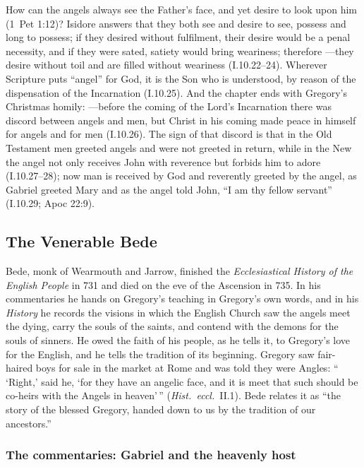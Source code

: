 How can the angels always see the Father's face, and yet desire to look upon
him (1~Pet 1:12)? Isidore answers that they both see and desire
to see, possess and long to possess; if they desired without fulfilment,
their desire would be a penal necessity, and if they were sated, satiety
would bring weariness; therefore ---they desire without toil and are filled without weariness
(I.10.22--24). Wherever Scripture puts ``angel'' for God, it is the Son who is
understood, by reason of the dispensation of the Incarnation (I.10.25). And
the chapter ends with Gregory's Christmas homily: ---before the
coming of the Lord's Incarnation there was discord between angels and men,
but Christ in his coming made peace in himself for angels and for men
(I.10.26). The sign of that discord is that in the Old Testament men greeted
angels and were not greeted in return, while in the New the angel not only
receives John with reverence but forbids him to adore (I.10.27--28); now man
is received by God and reverently greeted by the angel, as Gabriel greeted
Mary and as the angel told John, ``I am thy fellow servant'' (I.10.29; Apoc
22:9).

\sectionguard
\subsection{The Venerable Bede}\label{sec:fa-bede}

Bede, monk of Wearmouth and Jarrow, finished the \emph{Ecclesiastical History of the
English People} in 731 and died on the eve of the Ascension in 735. In his
commentaries he hands on Gregory's teaching in Gregory's own words, and in
his \emph{History} he records the visions in which the English Church saw the
angels meet the dying, carry the souls of the saints, and contend with the
demons for the souls of sinners. He owed the faith of his people, as he tells
it, to Gregory's love for the English, and he tells the tradition of its
beginning. Gregory saw fair-haired boys for sale in the market at Rome and was
told they were Angles: `` `Right,' said he, `for they have an angelic face,
and it is meet that such should be co-heirs with the Angels in heaven'\,''
(\emph{Hist.\ eccl.}\ II.1). Bede relates it as ``the story of the blessed
Gregory, handed down to us by the tradition of our ancestors.''

\subsubsection{The commentaries: Gabriel and the heavenly host}

